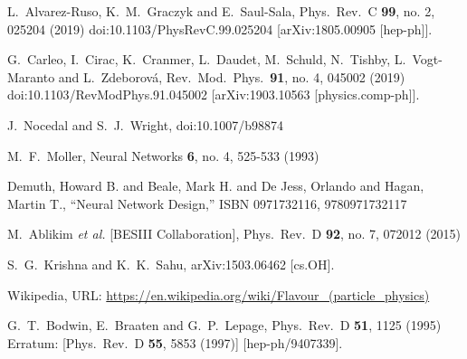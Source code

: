 \begin{thebibliography}{99}
  L.~Alvarez-Ruso, K.~M.~Graczyk and E.~Saul-Sala,
  Phys.\ Rev.\ C {\bf 99}, no. 2, 025204 (2019)
  doi:10.1103/PhysRevC.99.025204
  [arXiv:1805.00905 [hep-ph]].
  
  G.~Carleo, I.~Cirac, K.~Cranmer, L.~Daudet, M.~Schuld, N.~Tishby, L.~Vogt-Maranto and L.~Zdeborová,
  Rev.\ Mod.\ Phys.\  {\bf 91}, no. 4, 045002 (2019)
  doi:10.1103/RevModPhys.91.045002
  [arXiv:1903.10563 [physics.comp-ph]].
  
  J.~Nocedal and S.~J.~Wright,
  doi:10.1007/b98874
  
  M.~F.~Moller, 
  Neural Networks {\bf 6}, no. 4, 525-533 (1993)
  
  Demuth, Howard B. and Beale, Mark H. and De Jess, Orlando and Hagan, Martin T.,
``Neural Network Design,''
ISBN 0971732116, 9780971732117  

  M.~Ablikim {\it et al.} [BESIII Collaboration],
  Phys.\ Rev.\ D {\bf 92}, no. 7, 072012 (2015)
  
  S.~G.~Krishna and K.~K.~Sahu,
  arXiv:1503.06462 [cs.OH].

Wikipedia, URL: \url{https://en.wikipedia.org/wiki/Flavour_(particle_physics)}

  G.~T.~Bodwin, E.~Braaten and G.~P.~Lepage,
  Phys.\ Rev.\ D {\bf 51}, 1125 (1995)
  Erratum: [Phys.\ Rev.\ D {\bf 55}, 5853 (1997)]
  [hep-ph/9407339].
  

\end{thebibliography}
